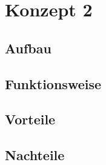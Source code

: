 \section{Konzept 2}

\subsection{Aufbau}

\subsection{Funktionsweise}

\subsection{Vorteile}

\subsection{Nachteile}
